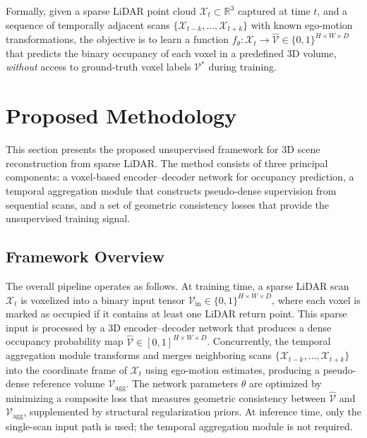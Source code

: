 \documentclass[a4paper, 12pt]{article}
\begin{document}
	Formally, given a sparse LiDAR point cloud $\mathcal{X}_t \subset
	\mathbb{R}^3$ captured at time $t$, and a sequence of temporally adjacent
	scans $\{\mathcal{X}_{t-k}, \ldots, \mathcal{X}_{t+k}\}$ with known ego-motion
	transformations, the objective is to learn a function
	$f_\theta : \mathcal{X}_t \rightarrow \hat{\mathcal{V}} \in \{0, 1\}^{H
		\times W \times D}$ that predicts the binary occupancy of each voxel in a
	predefined 3D volume, \textit{without} access to ground-truth voxel labels
	$\mathcal{V}^*$ during training.
	
	\section{Proposed Methodology}
	
	This section presents the proposed unsupervised framework for 3D scene
	reconstruction from sparse LiDAR. The method consists of three principal
	components: a voxel-based encoder--decoder network for occupancy prediction,
	a temporal aggregation module that constructs pseudo-dense supervision from
	sequential scans, and a set of geometric consistency losses that provide the
	unsupervised training signal.
	
	\subsection{Framework Overview}
	
	The overall pipeline operates as follows. At training time, a sparse LiDAR
	scan $\mathcal{X}_t$ is voxelized into a binary input tensor
	$\mathcal{V}_{\text{in}} \in \{0, 1\}^{H \times W \times D}$, where each
	voxel is marked as occupied if it contains at least one LiDAR return point.
	This sparse input is processed by a 3D encoder--decoder network that produces
	a dense occupancy probability map $\hat{\mathcal{V}} \in [0, 1]^{H \times W
		\times D}$. Concurrently, the temporal aggregation module transforms and
	merges neighboring scans $\{\mathcal{X}_{t-k}, \ldots, \mathcal{X}_{t+k}\}$
	into the coordinate frame of $\mathcal{X}_t$ using ego-motion estimates,
	producing a pseudo-dense reference volume $\mathcal{V}_{\text{agg}}$. The
	network parameters $\theta$ are optimized by minimizing a composite loss that
	measures geometric consistency between $\hat{\mathcal{V}}$ and
	$\mathcal{V}_{\text{agg}}$, supplemented by structural regularization priors.
	At inference time, only the single-scan input path is used; the temporal
	aggregation module is not required.
	
\end{document}
